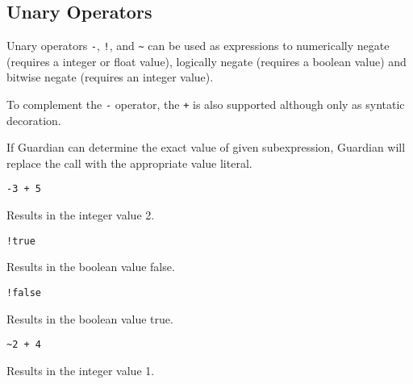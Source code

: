 
\subsection{Unary Operators}
{
	Unary operators \texttt{-}, \texttt{!},
	and \texttt{\~} can be used as expressions to
	numerically negate (requires a integer or float value),
	logically negate (requires a boolean value) and
	bitwise negate (requires an integer value).
	
	To complement the \texttt{-} operator, the \texttt{+} is also supported
	although only as syntatic decoration.
	
	If Guardian can determine the exact value of given subexpression,
	Guardian will replace the call with the appropriate value literal.
	
	\begin{itemize}
	{
		\item[] \texttt{-3 + 5}
		
			Results in the integer value 2.
		
		\item[] \texttt{!true}
		
			Results in the boolean value false.
		
		\item[] \texttt{!false}
		
			Results in the boolean value true.
		
		\item[] \texttt{\~{}2 + 4}
		
			Results in the integer value 1.
	}
	\end{itemize}
}

